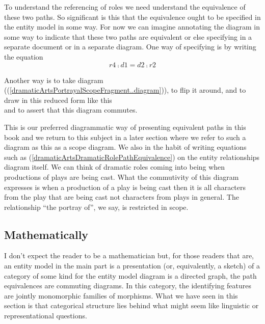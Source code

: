 To understand the referencing of roles we need understand the equivalence of these two paths. 
So significant is this that the equivalence ought to be specified in the entity model in some way.
For now we can imagine annotating the diagram in some way to indicate that these two paths are equivalent 
or else specifying in a separate document or in a separate diagram. 
One way of specifying is by writing the equation
\begin{equation}
\label{dramaticArtsDramaticRolePathEquivalence}
r4 \comp d1 = d2 \comp r2
\end{equation}

Another way is to take diagram ((\ref{dramaticArtsPortrayalScopeFragment..diagram})), 
to flip it  around, and to draw  in this reduced form like this
\begin{equation}
\label{dramaticArtsPortrayalScopeAppearance1}

\end{equation}
and to assert that this diagram commutes.

This is our preferred diagrammatic way of presenting equivalent paths in this book and we return to this subject in a later section where we refer to such a diagram as this as a scope diagram. 
We also in the habit of writing equations such as (\ref{dramaticArtsDramaticRolePathEquivalence}) on the entity relationships diagram itself.
We can think of dramatic roles coming into being when productions of plays are being cast. What the commutivity of this diagram expresses is when a production of a play is being cast then it is all characters from the play that are being cast not characters from plays in general. 
The relationship ``the portray of'', we say, is restricted in scope.



\subsection{Mathematically}
\mynote
I don't expect the reader to be a mathematician but, for those readers that are, 
an entity model in the main part is a presentation 
(or, equivalently, a sketch) of a category of some kind for the entity model diagram is a directed graph, 
the path equivalences are commuting diagrams. 
In this category, the identifying features are jointly monomorphic families of morphisms.
What we have seen in this section is that categorical structure lies behind what might seem like linguistic or representational questions.

